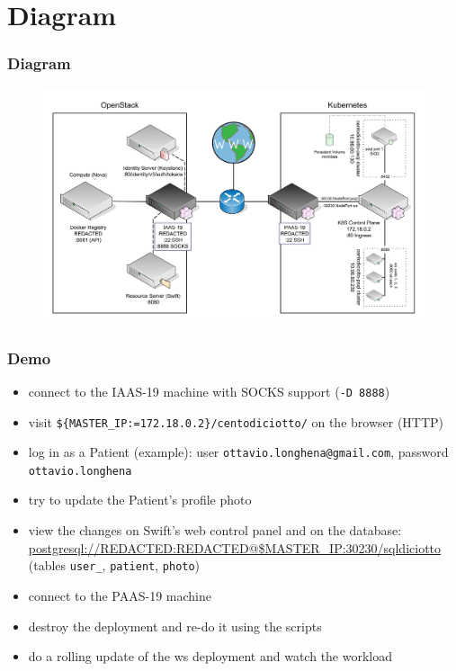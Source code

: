 \documentclass[handout,10pt]{beamer}
\title[FCC-21 Group Project]{}
\author[Group 19]{}
\institute[Facchinetti, Franzil]{}
\date[09/06/2021]{9 June 2021}
\begin{document}
\section{Diagram}

\begin{frame}
    \frametitle{Diagram}
    \begin{figure}
    	\centering
    	\includegraphics[height=0.8\textheight]{diagram/diagram.png}
	\end{figure}
\end{frame}

\begin{frame}
    \frametitle{Demo}
    \begin{itemize}
		\item connect to the IAAS-19 machine with SOCKS support (\texttt{-D 8888})
		\item visit \texttt{\$\{MASTER\_IP:=172.18.0.2\}/centodiciotto/} on the browser (HTTP)
		\item log in as a Patient (example): user \texttt{ottavio.longhena@gmail.com}, password \texttt{ottavio.longhena}
		\item try to update the Patient's profile photo
		\item view the changes on Swift's web control panel and on the database: \url{postgresql://REDACTED:REDACTED@$MASTER_IP:30230/sqldiciotto} (tables \texttt{user\_}, \texttt{patient}, \texttt{photo})
		\item connect to the PAAS-19 machine
		\item destroy the deployment and re-do it using the scripts
		\item do a rolling update of the ws deployment and watch the workload
	\end{itemize}
\end{frame}
\end{document}

